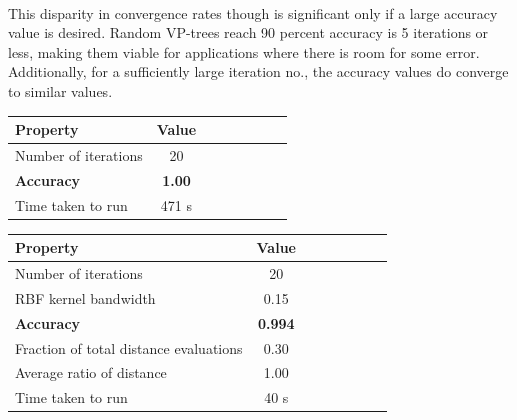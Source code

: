 \documentclass[11pt]{article}
\begin{document}
\pagebreak
\\
This disparity in convergence rates though is significant only if a large accuracy value is desired. Random VP-trees reach 90 percent accuracy is 5 iterations or less, making them viable for applications where there is room for some error. Additionally, for a sufficiently large iteration no., the accuracy values do converge to similar values.
\begin{center}
\begin{tabular}{l*{6}{c}r} Property & Value \\ 
\hline 
Number of iterations & 20 \\ 
\textbf{Accuracy} & \textbf{1.00} \\
Time taken to run & 471 s \\
\end{tabular}
 \label{tab:kd_susy}
\end{center}
\begin{center}
\begin{tabular}{l*{6}{c}r} Property & Value \\ 
\hline 
Number of iterations & 20\\
RBF kernel bandwidth & 0.15 \\ 
\textbf{Accuracy} & \textbf{0.994} \\
Fraction of total distance evaluations & 0.30 \\
Average ratio of distance & 1.00 \\
Time taken to run & 40 s \\
\end{tabular}
 \label{tab:vp_susy}
\end{center}
\end{document}

